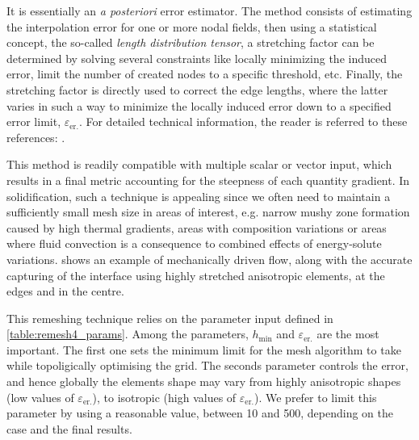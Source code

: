 It is essentially an \emph{a posteriori} error estimator. The method consists of estimating the interpolation error for
one or more nodal fields, then using a statistical concept, the so-called \emph{length distribution tensor}, a stretching factor
can be determined by solving several constraints like locally minimizing the induced error, limit the number of created nodes to
a specific  threshold, etc. Finally, the stretching factor is directly used to correct the edge lengths, where the latter varies in such a way to minimize the locally induced error down
to a specified error limit, $\varepsilon_\text{er.}$.
For detailed technical information, the reader is referred to these references: \citep{coupez_metric_2011,coupez_edge-based_2013,el_jannoun_space-time_2014}.

This method is readily compatible with multiple scalar or vector input, which results in a final metric accounting
for the steepness of each quantity gradient. In solidification, such a technique is appealing since we often need 
to maintain a sufficiently small mesh size in areas of interest, e.g. narrow mushy zone formation caused by high thermal gradients, areas with composition variations or
areas where fluid convection is a consequence to combined effects of energy-solute variations.  shows an example of mechanically driven flow,
along with the accurate capturing of the interface using highly stretched anisotropic elements, at the edges and in the centre.

This remeshing technique relies on the parameter input defined in \cref{table:remesh4_params}.
Among the parameters, $h_\text{min}$ and $\varepsilon_\text{er.}$ are the most important.
The first one sets the minimum limit for the mesh algorithm to take while topoligically optimising the grid. 
The seconds parameter controls the error, and hence globally the elements shape may vary from highly anisotropic 
shapes (low values of $\varepsilon_\text{er.}$), to isotropic (high values of $\varepsilon_\text{er.}$).
We prefer to limit this parameter by using a reasonable value, between 10 and 500, depending on the case and the final results.


